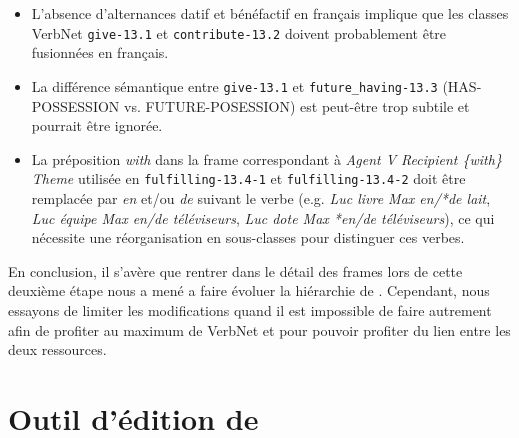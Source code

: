 \begin{itemize}
    \item L'absence d'alternances datif et bénéfactif en français implique que
        les classes VerbNet {\color{blue}\texttt{give-13.1}} et
        {\color{blue}\texttt{contribute-13.2}} doivent probablement être fusionnées en
        français.
    \item La différence sémantique entre {\color{blue}\texttt{give-13.1}} et
        {\color{blue}\texttt{future\_having-13.3}} (HAS-POSSESSION vs. FUTURE-POSESSION)
        est peut-être trop subtile et pourrait être ignorée.
    \item La préposition \emph{with} dans la frame correspondant à \emph{Agent
        V Recipient \{with\} Theme} utilisée en
        {\color{blue}\texttt{fulfilling-13.4-1}} et
        {\color{blue}\texttt{fulfilling-13.4-2}} doit être remplacée par
        \emph{en} et/ou \emph{de} suivant le verbe (e.g. \emph{Luc livre Max
        en/*de lait}, \emph{Luc équipe Max en/de téléviseurs}, \emph{Luc dote
        Max *en/de téléviseurs}), ce qui nécessite une réorganisation en
        sous-classes pour distinguer ces verbes.
\end{itemize}

En conclusion, il s'avère que rentrer dans le détail des frames lors de cette
deuxième étape nous a mené a faire évoluer la hiérarchie de \verbenet{}.
Cependant, nous essayons de limiter les modifications quand il est impossible
de faire autrement afin de profiter au maximum de VerbNet et pour pouvoir
profiter du lien entre les deux ressources.

\section{Outil d'édition de \verbenet{}}\label{toolquentin}

